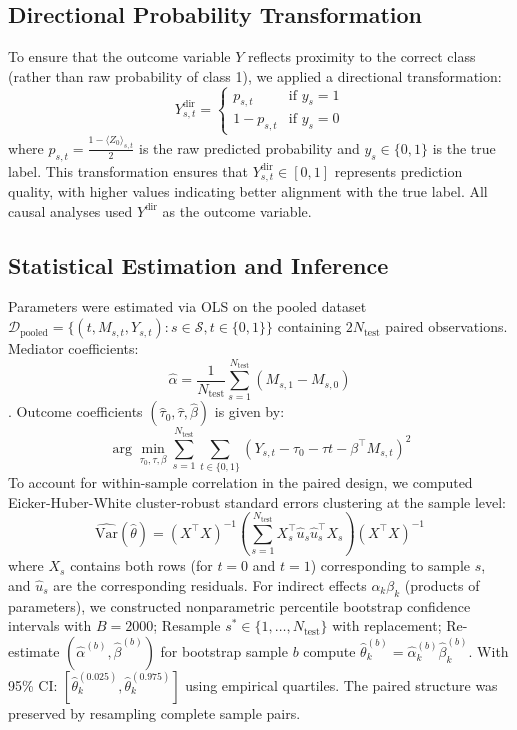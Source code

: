 \documentclass[
    reprint,
    amsmath, amssymb,
    aps,
    floatfix,
    nofootinbib
]{revtex4-1}
\begin{document}
\subsection*{Directional Probability Transformation}

To ensure that the outcome variable $Y$ reflects proximity to the correct class (rather than raw probability of class 1), we applied a directional transformation:
\begin{equation}
Y_{s,t}^{\text{dir}} = \begin{cases}
p_{s,t} & \text{if } y_s = 1 \\
1 - p_{s,t} & \text{if } y_s = 0
\end{cases}
\end{equation}
where $p_{s,t} = \frac{1 - \langle Z_0 \rangle_{s,t}}{2}$ is the raw predicted probability and $y_s \in \{0,1\}$ is the true label. This transformation ensures that $Y_{s,t}^{\text{dir}} \in [0,1]$ represents prediction quality, with higher values indicating better alignment with the true label. All causal analyses used $Y^{\text{dir}}$ as the outcome variable.

\subsection*{Statistical Estimation and Inference}
Parameters were estimated via OLS on the pooled dataset $\mathcal{D}_{\text{pooled}} = \{(t, M_{s,t}, Y_{s,t}) : s \in \mathcal{S}, t \in \{0,1\}\}$ containing $2N_{\text{test}}$ paired observations. Mediator coefficients:
\begin{equation}
\hat{\alpha} = \frac{1}{N_{\text{test}}} \sum_{s=1}^{N_{\text{test}}} (M_{s,1} - M_{s,0})
\end{equation}.
Outcome coefficients $(\hat{\tau}_0, \hat{\tau}, \hat{\beta})$ is given by:
\begin{equation}
 \arg\min_{\tau_0, \tau, \beta} \sum_{s=1}^{N_{\text{test}}} \sum_{t \in \{0,1\}} \left( Y_{s,t} - \tau_0 - \tau t - \beta^\top M_{s,t} \right)^2
\end{equation}
To account for within-sample correlation in the paired design, we computed Eicker-Huber-White cluster-robust standard errors clustering at the sample level:
\begin{equation}
\widehat{\text{Var}}(\hat{\theta}) = (X^\top X)^{-1} \left( \sum_{s=1}^{N_{\text{test}}} X_s^\top \hat{u}_s \hat{u}_s^\top X_s \right) (X^\top X)^{-1}
\end{equation}
where $X_s$ contains both rows (for $t=0$ and $t=1$) corresponding to sample $s$, and $\hat{u}_s$ are the corresponding residuals.
For indirect effects $\alpha_k \beta_k$ (products of parameters), we constructed nonparametric percentile bootstrap confidence intervals with $B=2000$; Resample $s^* \in \{1, \ldots, N_{\text{test}}\}$ with replacement; Re-estimate $(\hat{\alpha}^{(b)}, \hat{\beta}^{(b)})$ for bootstrap sample $b$ compute $\hat{\theta}_k^{(b)} = \hat{\alpha}_k^{(b)} \hat{\beta}_k^{(b)}$. With  95\% CI: $[\hat{\theta}_k^{(0.025)}, \hat{\theta}_k^{(0.975)}]$ using empirical quartiles. The paired structure was preserved by resampling complete sample pairs.
\end{document}
